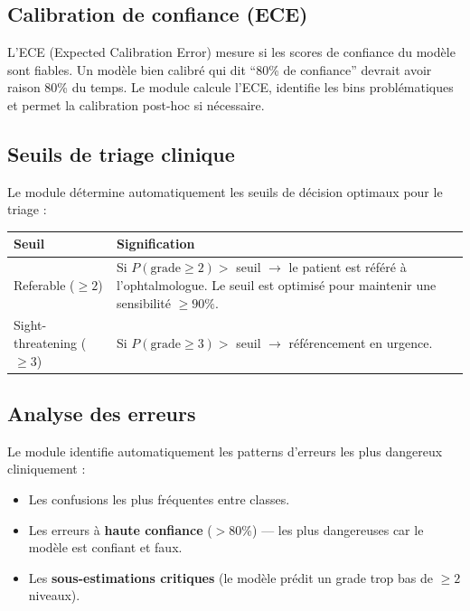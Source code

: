 ﻿\documentclass[11pt,a4paper]{article}
\begin{document}
\subsection{Calibration de confiance (ECE)}

L'ECE (Expected Calibration Error) mesure si les scores de confiance du modèle sont fiables. Un modèle bien calibré qui dit ``80\% de confiance'' devrait avoir raison 80\% du temps. Le module calcule l'ECE, identifie les bins problématiques et permet la calibration post-hoc si nécessaire.

\subsection{Seuils de triage clinique}

Le module détermine automatiquement les seuils de décision optimaux pour le triage :

\begin{center}
\renewcommand{\arraystretch}{1.3}
\begin{tabularx}{\textwidth}{lX}
\toprule
\textbf{Seuil} & \textbf{Signification} \\
\midrule
Referable ($\geq 2$) & Si $P(\text{grade} \geq 2) >$ seuil $\to$ le patient est référé à l'ophtalmologue. Le seuil est optimisé pour maintenir une sensibilité $\geq 90\%$. \\
Sight-threatening ($\geq 3$) & Si $P(\text{grade} \geq 3) >$ seuil $\to$ référencement en urgence. \\
\bottomrule
\end{tabularx}
\end{center}

\subsection{Analyse des erreurs}

Le module identifie automatiquement les patterns d'erreurs les plus dangereux cliniquement :
\begin{itemize}[leftmargin=2em]
  \item Les confusions les plus fréquentes entre classes.
  \item Les erreurs à \textbf{haute confiance} ($>$80\%) --- les plus dangereuses car le modèle est confiant et faux.
  \item Les \textbf{sous-estimations critiques} (le modèle prédit un grade trop bas de $\geq 2$ niveaux).
\end{itemize}
\end{document}
